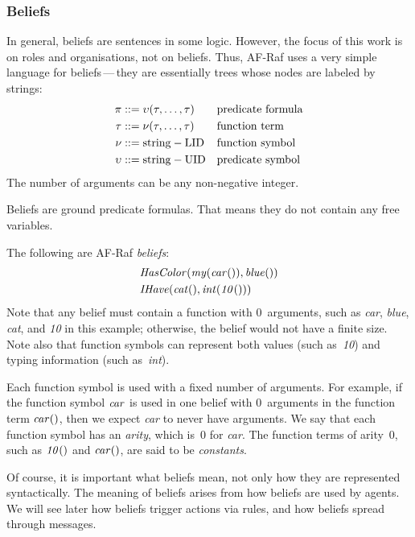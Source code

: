 \documentclass[a4paper,12pt,oneside,fleqn]{book} %
\begin{document}
{\subsubsection{Beliefs}

In general, beliefs are sentences in some logic.  However, the focus of
this work is on roles and organisations, not on beliefs.  Thus, AF-Raf uses
a very simple language for beliefs\,---\,they are essentially trees whose
nodes are labeled by strings: \begin{align} \pi &::=
\upsilon(\tau,\ldots,\tau) && \text{predicate formula} \\ \tau &::= \nu(\tau,\ldots,\tau)
&& \text{function term} \\ \nu  &::= {\rm string-LID} &&\text{function symbol}
\\ \upsilon  &::= {\rm string-UID} &&\text{predicate symbol} \end{align} The number of arguments can be any non-negative integer.

Beliefs are ground predicate formulas. That means they do not contain any
free variables.

\begin{example}
The following are AF-Raf \emph{beliefs}:
\begin{align}
&{\it HasColor}({\it my}({\it car}()), {\it blue}()) \\
&{\it IHave}({\it cat}(), {\it int}({\it 10}()))
\end{align}
Note that any belief must contain a function with $0$~arguments, such as
{\it car}, {\it blue}, {\it cat}, and {\it 10\/} in this example;
otherwise, the belief would not have a finite size.  Note also that
function symbols can represent both values (such as~{\it 10\/}) and typing
information (such as~{\it int\/}).
\end{example}

Each function symbol is used with a fixed number of arguments.  For
example, if the function symbol ${\it car}$ is used in one belief with
$0$~arguments in the function term ${\it car}()$, then we expect {\it
car\/} to never have arguments.  We say that each function symbol has an
\emph{arity}, which is~$0$ for {\it car}.  The function terms of arity~$0$,
such as ${\it 10}()$ and ${\it car}()$, are said to be \emph{constants}.

\begin{remark}
Of course, it is important what beliefs mean, not only how they are
represented syntactically.  The meaning of beliefs arises from how beliefs
are used by agents.  We will see later how beliefs trigger actions via
rules, and how beliefs spread through messages.
\end{remark}

}
\end{document}
